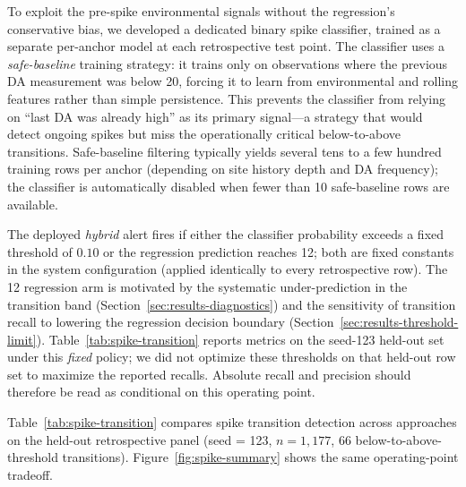\documentclass[toxins,article,submit,moreauthors]{Definitions/mdpi}
\begin{document}
To exploit the pre-spike environmental signals without the regression's conservative bias, we developed a dedicated binary spike classifier, trained as a separate per-anchor model at each retrospective test point. The classifier uses a \emph{safe-baseline} training strategy: it trains only on observations where the previous DA measurement was below \SI{20}{\microgrampeg}, forcing it to learn from environmental and rolling features rather than simple persistence. This prevents the classifier from relying on ``last DA was already high'' as its primary signal---a strategy that would detect ongoing spikes but miss the operationally critical below-to-above transitions. Safe-baseline filtering typically yields several tens to a few hundred training rows per anchor (depending on site history depth and DA frequency); the classifier is automatically disabled when fewer than 10 safe-baseline rows are available.

The deployed \emph{hybrid} alert fires if either the classifier probability exceeds a fixed threshold of $0.10$ or the regression prediction reaches \SI{12}{\microgrampeg}; both are fixed constants in the system configuration (applied identically to every retrospective row). The \SI{12}{\microgrampeg} regression arm is motivated by the systematic under-prediction in the transition band (Section~\ref{sec:results-diagnostics}) and the sensitivity of transition recall to lowering the regression decision boundary (Section~\ref{sec:results-threshold-limit}). Table~\ref{tab:spike-transition} reports metrics on the seed-123 held-out set under this \emph{fixed} policy; we did not optimize these thresholds on that held-out row set to maximize the reported recalls. Absolute recall and precision should therefore be read as conditional on this operating point.

Table~\ref{tab:spike-transition} compares spike transition detection across approaches on the held-out retrospective panel (seed = 123, $n = 1{,}177$, 66 below-to-above-threshold transitions). Figure~\ref{fig:spike-summary} shows the same operating-point tradeoff.
\end{document}
